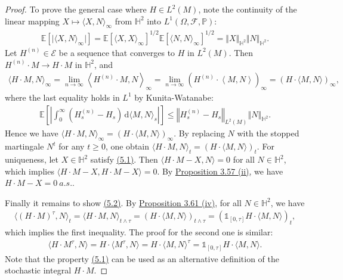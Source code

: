 \documentclass{article}
\numberwithin{equation}{section}
\newcommand{\E}{\mathbb{E}}
\renewcommand{\P}{\mathbb{P}}
\renewcommand{\d}{\mathrm{d}}
\theoremstyle{plain}
\theoremstyle{definition}
\begin{document}
\begin{proof}
To prove the general case where $H\in L^2(M)$, note the continuity of the linear mapping $X\mapsto\langle X,N\rangle_\infty$ from $\mathbb{H}^2$ into $L^1(\Omega,\mathscr{F},\P)$:
\begin{align*}
	\E\left[\vert\langle X,N\rangle_\infty\vert\right]=\E\left[\langle X,X\rangle_\infty\right]^{1/2}\E\left[\langle N,N\rangle_\infty\right]^{1/2}=\Vert X\Vert_{\mathbb{H}^2}\Vert N\Vert_{\mathbb{H}^2}.
\end{align*}
Let $H^{(n)}\in\mathscr{E}$ be a sequence that converges to $H$ in $L^2(M)$. Then $H^{(n)}\cdot M\to H\cdot M$ in $\mathbb{H}^2$, and
\begin{align*}
	\langle H\cdot M,N\rangle_\infty = \lim_{n\to\infty}\left\langle H^{(n)}\cdot M,N\right\rangle_\infty = \lim_{n\to\infty}\left(H^{(n)}\cdot\left\langle M,N\right\rangle\right)_\infty = (H\cdot\langle M,N\rangle)_\infty,
\end{align*}
where the last equality holds in $L^1$ by Kunita-Watanabe:
\begin{align*}
	\E\left[\left\vert\int_0^\infty(H^{(n)}_s-H_s)\,\d \langle M,N\rangle_s\right\vert\right]\leq\left\Vert H_s^{(n)}-H_s\right\Vert_{L^2(M)}\left\Vert N\right\Vert_{\mathbb{H}^2}.
\end{align*}
Hence we have $\langle H\cdot M,N\rangle_\infty=(H\cdot\langle M,N\rangle)_\infty$. By replacing $N$ with the stopped martingale $N^t$ for any $t\geq 0$, one obtain $\langle H\cdot M,N\rangle_t = (H\cdot\langle M,N\rangle)_t$. For uniqueness, let $X\in\mathbb{H}^2$ satisfy \hyperref[eq:5.1]{(5.1)}. Then $\langle H\cdot M-X,N\rangle= 0$ for all $N\in\mathbb{H}^2$, which implies $\langle H\cdot M-X,H\cdot M-X\rangle=0$. By \hyperref[prop:3.57]{Proposition 3.57 (ii)}, we have $H\cdot M-X=0\ a.s.$.

Finally it remains to show \hyperref[eq:5.2]{(5.2)}. By \hyperref[prop:3.61]{Proposition 3.61 (iv)}, for all $N\in\mathbb{H}^2$, we have
\begin{align*}
	\langle (H\cdot M)^\tau,N\rangle_t = \langle H\cdot M,N\rangle_{t\wedge\tau} = \left(H\cdot\langle M,N\rangle\right)_{t\wedge\tau}=\left(\mathds{1}_{[0,\tau]}H\cdot\langle M,N\rangle\right)_t,
\end{align*}
which implies the first inequality. The proof for the second one is similar:
\begin{align*}
	\langle H\cdot M^\tau,N\rangle = H\cdot\langle M^\tau,N\rangle = H\cdot\langle M,N\rangle^\tau = \mathds{1}_{[0,\tau]}H\cdot \langle M,N\rangle.
\end{align*}
Note that the property \hyperref[eq:5.1]{(5.1)} can be used as an alternative definition of the stochastic integral $H\cdot M$.
\end{proof}
\end{document}
